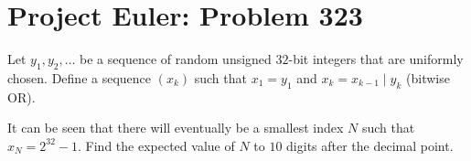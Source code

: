 \documentclass[a5paper, 10pt]{article}
\begin{document}
\section*{Project Euler: Problem 323}

\begin{chirpbox}
\begin{problem}
    Let \( y_1, y_2, \ldots \) be a sequence of random unsigned \( 32 \)-bit integers that are uniformly chosen. Define a sequence \( (x_k) \) such that \( x_1 = y_1 \) and \( x_k = x_{k - 1} \mid y_k \) (bitwise OR).

    \vspace{0.3cm}

    It can be seen that there will eventually be a smallest index \( N \) such that \( x_N = 2^{32} - 1 \). Find the expected value of \( N \) to \( 10 \) digits after the decimal point.
\end{problem}
\end{chirpbox}
\end{document}
